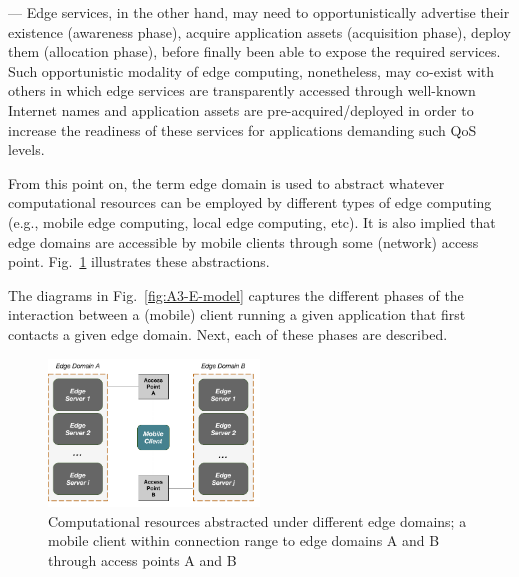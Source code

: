 --- Edge services, in the other hand, may need to opportunistically advertise their existence (awareness phase), acquire application assets (acquisition phase), deploy them (allocation phase), before finally been able to expose the required services. Such opportunistic modality of edge computing, nonetheless, may co-exist with others in which edge services are transparently accessed through well-known Internet names and application assets are pre-acquired/deployed in order to increase the readiness of these services for applications demanding such QoS levels. 


From this point on, the term edge domain is used to abstract whatever computational resources can be employed by different types of edge computing (e.g., mobile edge computing, local edge computing, etc). It is also implied that edge domains are accessible by mobile clients through some (network) access point. Fig.~\ref{fig:edge-domain-client} illustrates these abstractions. 

The diagrams in Fig.~\ref{fig:A3-E-model} captures the different phases of the interaction between a (mobile) client running a given application that first contacts a given edge domain. Next, each of these phases are described.

\begin{figure}
  \includegraphics[width=0.5\textwidth]{figs/edge-domain-client.png}
  \caption{Computational resources abstracted under different edge domains; a mobile client within connection range to edge domains A and B through access points A and B}
  \label{fig:edge-domain-client}
\end{figure}

